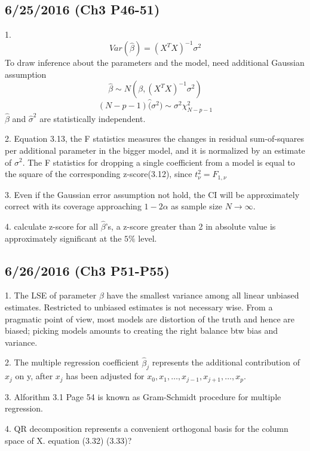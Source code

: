 \documentclass[a4paper, 12pt]{article}
\begin{document}
\subsection*{6/25/2016 (Ch3 P46-51)}

1.$$Var(\hat{\beta})=(X^TX)^{-1}\sigma^2$$
To  draw inference about the parameters and the  model, need additional Gaussian assumption
$$\hat{\beta} \sim N(\beta,(X^TX)^{-1}\sigma^2 )$$
$$(N-p-1)\hat(\sigma^2) \sim \sigma^2\chi^2_{N-p-1}$$
$\hat{\beta}$ and $\hat{\sigma}^2$ are statistically independent.

2. Equation 3.13, the F statistics measures the changes in residual sum-of-squares per additional parameter in the bigger model, and it is normalized by an estimate of $\sigma^2$. The F statistics for dropping a single coefficient from a model is equal to the square of the corresponding z-score(3.12), since $t_{\nu}^2=F_{1,\nu}$

3. Even if the Gaussian error assumption not hold, the CI will be approximately correct with its coverage approaching $1-2\alpha$ as sample size $N \rightarrow \infty$.

4. calculate z-score for all $\hat{\beta}$'s, a z-score greater than 2 in absolute value is approximately significant at the $5\%$ level.

\subsection*{6/26/2016 (Ch3 P51-P55)}

1. The LSE of parameter $\beta$ have the smallest variance among all linear unbiased estimates. Restricted to unbiased estimates is not necessary wise. From a pragmatic point of view, most models are distortion of the truth and hence are biased; picking models amounts to creating the right balance btw bias and variance.

2. The multiple regression coefficient $\hat{\beta}_j$ represents the additional contribution of $x_j$ on y, after $x_j$ has been adjusted for $x_0,x_1,\ldots,x_{j-1},x_{j+1},\ldots,x_p$.

3. Alforithm 3.1 Page 54 is known as Gram-Schmidt procedure for multiple regression.

4. QR decomposition represents a convenient orthogonal basis for the column space of X. {\color{red} equation (3.32) (3.33)?}
\end{document}
